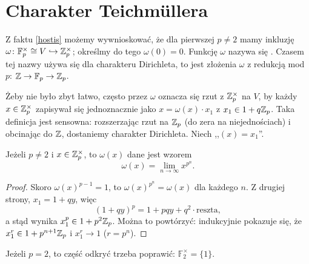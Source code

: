 \section{Charakter Teichmüllera\label{sekcjateich}}
Z faktu \ref{hostis} możemy wywnioskować, że dla pierwszej $p \neq 2$ mamy inkluzję $\omega \colon \mathbb F_p^\times \cong V \hookrightarrow \mathbb Z_p^\times$; określmy do tego $\omega(0) = 0$.
Funkcję $\omega$ nazywa się .
Czasem tej nazwy używa się dla charakteru Dirichleta, to jest złożenia $\omega$ z redukcją mod $p$: $\mathbb Z \to \mathbb F_p \to \mathbb Z_p$.

Żeby nie było zbyt łatwo, często przez $\omega$ oznacza się rzut z $\mathbb Z_p^\times$ na $V$, by każdy $x\in \mathbb Z_p^\times$ zapisywał się jednoznacznie jako $x = \omega(x) \cdot x_1$ z $x_1 \in 1 + q\mathbb Z_p$.
Taka definicja jest sensowna: rozszerzając rzut na $\mathbb Z_p$ (do zera na niejednościach) i obcinając do $\mathbb Z$, dostaniemy charakter Dirichleta.
Niech ,,$(x) = x_1$''.

\begin{fakt}
	Jeżeli $p \neq 2$ i $x \in \mathbb Z_p^\times$, to $\omega(x)$ dane jest wzorem
	\[
		\omega(x) = \lim_{n \to \infty} x^{p^n}.
	\]
\end{fakt}

\begin{proof}
	Skoro $\omega(x)^{p-1} = 1$, to $\omega(x)^{p^n} = \omega(x)$ dla każdego $n$.
	Z drugiej strony, $x_1 = 1 + qy$, więc
	\[
		(1 + qy)^p = 1 + pqy + q^2 \cdot \mbox{reszta},
	\]
	a stąd wynika $x_1^p \in 1 + p^2 \mathbb Z_p$.
	Można to powtórzyć: indukcyjnie pokazuje się, że $x_1^{r} \in 1 + p^{n+1} \mathbb Z_p$ i $x_1^r \to 1$ ($r = p^n$).
\end{proof}

Jeżeli $p = 2$, to część odkryć trzeba poprawić: $\mathbb F_2^\times = \{1\}$.